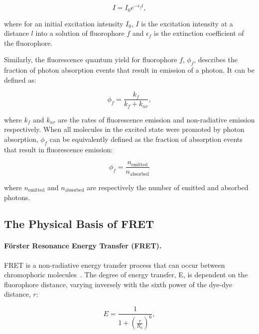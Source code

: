 \begin{equation}
I = I_0 e^{-\epsilon_f l},
\label{eq:ext_coeff}
\end{equation}

where for an initial excitation intensity $I_0$, $I$ is the excitation intensity at a distance $l$ into a solution of fluorophore $f$ and $\epsilon_f$ is the extinction coefficient of the fluorophore.

Similarly, the fluorescence quantum yield for fluorophore $f$, $\phi_f$, describes the fraction of photon absorption events that result in emission of a photon. It can be defined as: 

\begin{equation}
\phi_f = \frac{k_f}{k_f + k_{nr}},
\label{eq:quantum_yield}
\end{equation}

where $k_f$ and $k_{nr}$ are the rates of fluorescence emission and non-radiative emission respectively. When all molecules in the excited state were promoted by photon absorption, $\phi_f$ can be equivalently defined as the fraction of absorption events that result in fluorescence emission: 


\begin{equation}
\phi_f = \frac{n_{\text{emitted}}}{n_{\text{absorbed}}}
\label{eq:quantum_yield_ratio}
\end{equation}

where $n_{\text{emitted}}$ and $n_{\text{absorbed}}$ are respectively the number of emitted and absorbed photons.


\subsection{The Physical Basis of FRET}
\label{sect:fret}
\paragraph{F\"{o}rster Resonance Energy Transfer (FRET).}
FRET is a non-radiative energy transfer process that can occur between chromophoric molecules~\cite{forster48}. The degree of energy transfer, E, is dependent on the fluorophore distance, varying inversely with the sixth power of the dye-dye distance, $r$: 

\begin{equation}
E = \frac{1}{1+ (\frac{r}{R_0})^6},
\label{eq:FRET_d}
\end{equation}

